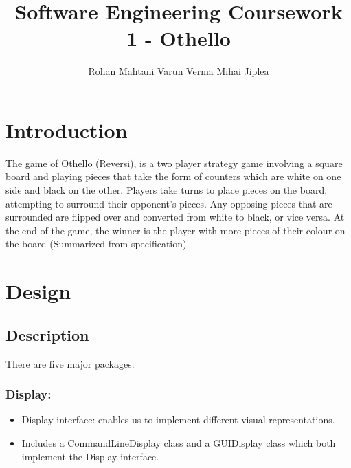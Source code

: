 \documentclass[english]{article}
\begin{document}
\title{Software Engineering Coursework 1 - Othello}


\author{Rohan Mahtani \hspace{1cm} Varun Verma \hspace{1cm} Mihai Jiplea}

\maketitle

\section{Introduction}

The game of Othello (Reversi), is a two player strategy game involving
a square board and playing pieces that take the form of counters which
are white on one side and black on the other. Players take turns to
place pieces on the board, attempting to surround their opponent's
pieces. Any opposing pieces that are surrounded are flipped over and
converted from white to black, or vice versa. At the end of the game,
the winner is the player with more pieces of their colour on the board
(Summarized from specification).


\section{Design}


\subsection{Description}

There are five major packages: 


\subsubsection{Display: }
\begin{itemize}
\item Display interface: enables us to implement different visual representations. 
\item Includes a CommandLineDisplay class and a GUIDisplay class which both
implement the Display interface.
\end{itemize}
\end{document}
